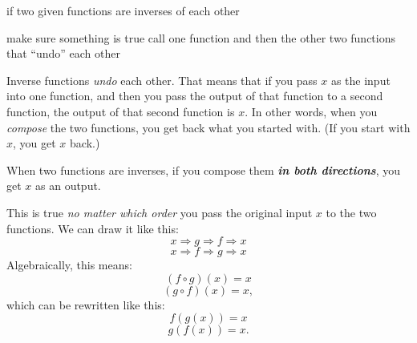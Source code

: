 \documentclass[fleqn,letterpaper,12pt,printwatermark=false]{memoir}
\begin{document}
\newcommand{\myClassName}{Pre-AP Algebra 2}
\newcommand{\myUnitNumber}{1}
\newcommand{\myUnitTitle}{Introduction to Functions}
\newcommand{\myLessonNumber}{11}
\newcommand{\myLessonTitle}{Verifying Inverses}



\pagestyle{myPagestyle}

\checkandfixthelayout
{}

\begin{myNotesHeader}
    \item {} if two given functions are inverses of each other
\end{myNotesHeader}

\begin{myVocabulary}
        {
            make sure something is true
        }
        {
            call one function and then the other
        }
        {
            two functions that ``undo'' each other
        }
\end{myVocabulary}

\begin{myLesson}
    Inverse functions \emph{undo} each other.
    That means that if you pass $x$ as the input into one function,
    and then you pass the output of that function to a second function,
    the output of that second function is $x$.
    In other words,
    when you \emph{compose} the two functions,
    you get back what you started with.
    (If you start with $x$, you get $x$ back.)

    \begin{myLessonBox}
        When two functions are inverses,
        if you compose them 
        {\bfseries\itshape in both directions},
        you get $x$ as an output.
    \end{myLessonBox}

    This is true 
    \emph{no matter which order} you pass the original input $x$
    to the two functions.
    We can draw it like this:
    \[
        x 
        \Longrightarrow 
        g 
        \Longrightarrow 
        f
        \Longrightarrow 
        x
    \]
    \[
        x 
        \Longrightarrow 
        f 
        \Longrightarrow 
        g 
        \Longrightarrow 
        x
    \]
    Algebraically, this means:
    \[
        (f \circ g)(x) = x
    \]
    \[
        (g \circ f)(x) = x,
    \]
    which can be rewritten like this:
    \[
        f(g(x)) = x
    \]
    \[
        g(f(x)) = x.
    \]
\end{myLesson}
\end{document}
